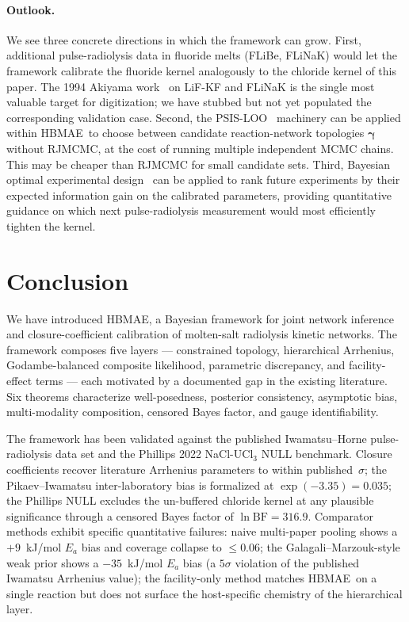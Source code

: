 \documentclass[12pt]{article}
\theoremstyle{plain}
\theoremstyle{definition}
\theoremstyle{remark}
\newcommand{\HBMAE}{HBMAE\xspace}
\begin{document}
\paragraph{Outlook.}  We see three concrete directions in which the
framework can grow.  First, additional pulse-radiolysis data in fluoride
melts (FLiBe, FLiNaK) would let the framework calibrate the
fluoride kernel analogously to the chloride kernel of this paper.
The 1994 Akiyama work~\citep{Akiyama1994} on LiF-KF and FLiNaK is the
single most valuable target for digitization; we have stubbed but not yet
populated the corresponding validation case.  Second, the
PSIS-LOO~\citep{Vehtari2017} machinery can be applied within \HBMAE\ to
choose between candidate reaction-network topologies $\boldsymbol\gamma$
without RJMCMC, at the cost of running multiple independent MCMC chains.
This may be cheaper than RJMCMC for small candidate sets.  Third, Bayesian
optimal experimental design~\citep{Foster2021} can be applied to rank
future experiments by their expected information gain on the calibrated
parameters, providing quantitative guidance on which next pulse-radiolysis
measurement would most efficiently tighten the kernel.

\section{Conclusion}\label{sec:conclusion}

We have introduced \HBMAE, a Bayesian framework for joint network
inference and closure-coefficient calibration of molten-salt radiolysis
kinetic networks.  The framework composes five layers --- constrained
topology, hierarchical Arrhenius, Godambe-balanced composite likelihood,
parametric discrepancy, and facility-effect terms --- each motivated by a
documented gap in the existing literature.  Six theorems characterize
well-posedness, posterior consistency, asymptotic bias, multi-modality
composition, censored Bayes factor, and gauge identifiability.

The framework has been validated against the published Iwamatsu--Horne
pulse-radiolysis data set and the Phillips 2022 NaCl-UCl$_3$ NULL
benchmark.  Closure coefficients recover literature Arrhenius parameters
to within published~$\sigma$; the Pikaev--Iwamatsu inter-laboratory bias
is formalized at $\exp(-3.35) = 0.035$; the Phillips NULL excludes the
un-buffered chloride kernel at any plausible significance through a
censored Bayes factor of $\ln\mathrm{BF}=316.9$.  Comparator methods
exhibit specific quantitative failures: naive multi-paper pooling shows a
$+9$~kJ/mol $E_a$ bias and coverage collapse to $\le 0.06$; the
Galagali--Marzouk-style weak prior shows a $-35$~kJ/mol $E_a$ bias (a
$5\sigma$ violation of the published Iwamatsu Arrhenius value); the
facility-only method matches \HBMAE\ on a single reaction but does not
surface the host-specific chemistry of the hierarchical layer.
\end{document}
